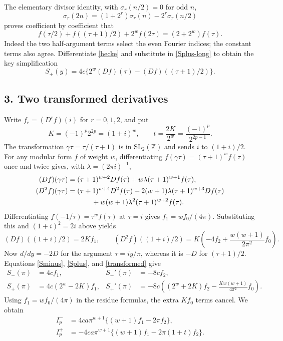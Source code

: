 \documentclass[11pt]{article}
\begin{document}
The elementary divisor identity, with $\sigma_r(n/2)=0$ for odd $n$,
\[
 \sigma_r(2n)=(1+2^r)\sigma_r(n)-2^r\sigma_r(n/2)
\]
proves coefficient by coefficient that
\begin{equation}\label{hecke}
 f(\tau/2)+f((\tau+1)/2)+2^wf(2\tau)=(2+2^w)f(\tau).
\end{equation}
Indeed the two half-argument terms select the even Fourier indices;
the constant terms also agree. Differentiate \eqref{hecke} and
substitute in \eqref{Splus-long} to obtain the key simplification
\begin{equation}\label{Splus}
 S_+(y)=4c\{2^w(Df)(\tau)-(Df)((\tau+1)/2)\}.
\end{equation}

\subsection*{3. Two transformed derivatives}
Write $f_r=(D^rf)(i)$ for $r=0,1,2$, and put
\[
 K=(-1)^p2^{2p}=(1+i)^w,\qquad t=\frac{2K}{2^w}
                                        =\frac{(-1)^p}{2^{2p-1}}.
\]
The transformation $\gamma\tau=\tau/(\tau+1)$ is in
$\mathrm{SL}_2(\mathbb Z)$ and sends $i$ to $(1+i)/2$.
For any modular form $f$ of weight $w$, differentiating
$f(\gamma\tau)=(\tau+1)^wf(\tau)$ once and twice gives, with
$\lambda=(2\pi i)^{-1}$,
\begin{align*}
 (Df)(\gamma\tau)
   &=(\tau+1)^{w+2}Df(\tau)
                   +w\lambda(\tau+1)^{w+1}f(\tau),\\
 (D^2f)(\gamma\tau)
   &=(\tau+1)^{w+4}D^2f(\tau)
     +2(w+1)\lambda(\tau+1)^{w+3}Df(\tau)\\
   &\hspace{12mm}+w(w+1)\lambda^2(\tau+1)^{w+2}f(\tau).
\end{align*}
Differentiating $f(-1/\tau)=\tau^wf(\tau)$ at $\tau=i$ gives
$f_1=wf_0/(4\pi)$. Substituting this and $(1+i)^2=2i$ above yields
\begin{equation}\label{transformed}
 (Df)((1+i)/2)=2Kf_1,\qquad
 (D^2f)((1+i)/2)
       =K\left(-4f_2+\frac{w(w+1)}{2\pi^2}f_0\right).
\end{equation}
Now $d/dy=-2D$ for the argument $\tau=iy/\pi$, whereas it is
$-D$ for $(\tau+1)/2$. Equations \eqref{Sminus}, \eqref{Splus},
and \eqref{transformed} give
\begin{align*}
 S_-(\pi)&=4cf_1,& S_-'(\pi)&=-8cf_2,\\
 S_+(\pi)&=4c(2^w-2K)f_1,&
 S_+'(\pi)&=-8c\left((2^w+2K)f_2
                           -\frac{Kw(w+1)}{4\pi^2}f_0\right).
\end{align*}
Using $f_1=wf_0/(4\pi)$ in the residue formulas, the extra
$Kf_0$ terms cancel. We obtain
\begin{align}
 I_p^-&=4ca\pi^{w+1}\{(w+1)f_1-2\pi f_2\},\label{Iminus}\\
 I_p^+&=-4ca\pi^{w+1}\{(w+1)f_1-2\pi(1+t)f_2\}.
                                                        \label{Iplus}
\end{align}
\end{document}
